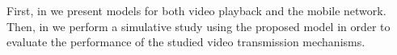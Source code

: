 First, in  we present models for both video playback and the mobile network.
Then, in  we perform a simulative study using the proposed model in order to evaluate the performance of the studied video transmission mechanisms.



 